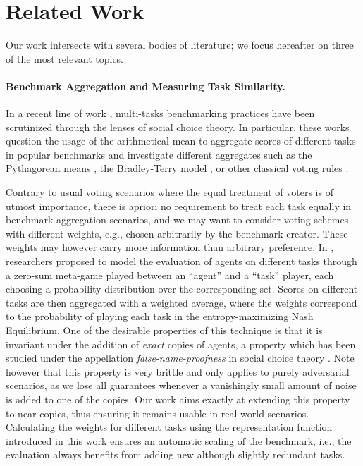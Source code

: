 \section{Related Work}
Our work intersects with several bodies of literature; we focus hereafter on 
three of the most relevant topics.



\paragraph{Benchmark Aggregation and Measuring Task Similarity.}

In a recent line of work \cite{colombo_what_2022,himmi_towards_2023,rofin_votenrank_2023,tatiana_how_2021,zhang_inherent_2024}, multi-tasks benchmarking practices have been scrutinized through the lenses of social choice theory. In particular, these works question the usage of the arithmetical mean to aggregate scores of different tasks in popular benchmarks \cite{koh_wilds_2021,wang_superglue_2020}
and investigate different aggregates such as the Pythagorean means \cite{tatiana_how_2021}, the Bradley-Terry model \cite{peyrard_better_2021}, or other classical voting rules \cite{colombo_what_2022,himmi_towards_2023,rofin_votenrank_2023}.

Contrary to usual voting scenarios where the equal treatment of voters is of utmost importance, there is apriori no requirement to treat each task equally in benchmark aggregation scenarios, and we may want to consider voting schemes with different weights, e.g., chosen arbitrarily by the benchmark creator.
These weights may however carry more information than arbitrary preference. In \cite{balduzzi_re-evaluating_2018}, researchers proposed to model the evaluation of agents on different tasks through a zero-sum meta-game played between an ``agent'' and a ``task'' player, each choosing a probability distribution over the corresponding set. Scores on different tasks are then aggregated with a weighted average, where the weights correspond to the probability of playing each task in the entropy-maximizing Nash Equilibrium. One of the desirable properties of this technique is that it is invariant under the addition of \emph{exact} copies of agents, a property which has been studied under the appellation \emph{false-name-proofness} in social choice theory \cite{conitzer_using_2010,nehama_manipulation-resistant_2022,todo_characterizing_2009}. Note however that this property is very brittle and only applies to purely adversarial scenarios, as we lose all guarantees whenever a vanishingly small amount of noise is added to one of the copies. 
Our work aims exactly at extending this property to near-copies, thus ensuring it remains usable in real-world scenarios. Calculating the weights for different tasks using the representation function introduced in this work ensures an automatic scaling of the benchmark, i.e., the evaluation always benefits from adding new although slightly redundant tasks.


